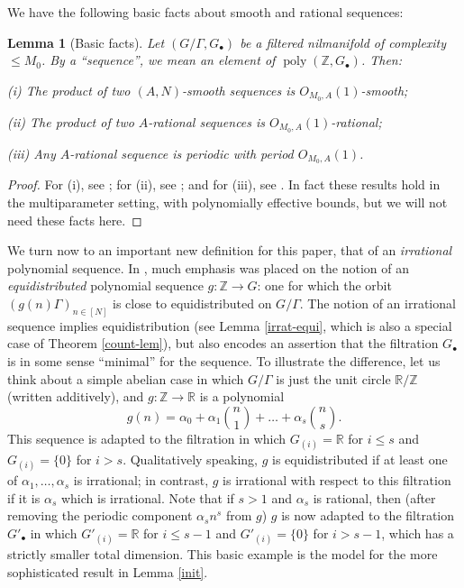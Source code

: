 \documentclass[11pt,reqno]{amsart}
\numberwithin{equation}{section}
\theoremstyle{plain}
\newtheorem{lemma}[subsection]{Lemma}
\theoremstyle{definition}
\renewcommand{\leq}{\leqslant}
\newcommand\Z{\mathbb{Z}}
\newcommand\R{\mathbb{R}}
\newcommand\1{{\bf 1}}
\newcommand\2{{\bf 2}}
\newcommand\poly{\operatorname{poly}}
\begin{document}
We have the following basic facts about smooth and rational sequences:

\begin{lemma}[Basic facts]\label{prod-smooth}  Let $(G/\Gamma,G_\bullet)$ be a filtered nilmanifold of complexity $\leq M_0$. By a ``sequence'', we mean an element of $\poly(\Z,G_{\bullet})$. Then:

\textup{(i)} The product of two $(A,N)$-smooth sequences is $O_{M_0,A}(1)$-smooth;

\textup{(ii)} The product of two $A$-rational sequences is $O_{M_0,A}(1)$-rational;
 
\textup{(iii)} Any $A$-rational sequence is periodic with period $O_{M_0,A}(1)$. 
\end{lemma}

\begin{proof} For (i), see \cite[Lemma 10.1]{green-tao-nilratner}; for (ii), see \cite[Lemma A.11 (v)]{green-tao-nilratner}; and for (iii), see \cite[Lemma A.12 (ii)]{green-tao-nilratner}.  In fact these results hold in the multiparameter setting, with polynomially effective bounds, but we will not need these facts here.
\end{proof}

We turn now to an important new definition for this paper, that of an \emph{irrational} polynomial sequence. In \cite{green-tao-nilratner}, much emphasis was placed on the notion of an \emph{equidistributed} polynomial sequence $g : \Z \rightarrow G$: one for which the orbit $(g(n)\Gamma)_{n \in [N]}$ is close to equidistributed on $G/\Gamma$. The notion of an irrational sequence implies equidistribution (see Lemma \ref{irrat-equi}, which is also a special case of Theorem \ref{count-lem}), but also encodes an assertion that the filtration $G_\bullet$ is in some sense ``minimal'' for the sequence. To illustrate the difference, let us think about a simple abelian case in which $G/\Gamma$ is just the unit circle $\R/\Z$ (written additively), and $g: \Z \to \R$ is a polynomial 
\begin{equation}\label{abelian-eq} g(n) = \alpha_0 + \alpha_1 \binom{n}{1} + \ldots + \alpha_s \binom{n}{s}.
\end{equation}
This sequence is adapted to the filtration in which $G_{(i)}=\R$ for $i \leq s$ and $G_{(i)}=\{0\}$ for $i>s$.
Qualitatively speaking, $g$ is equidistributed if at least one of $\alpha_1,\dots,\alpha_s$ is irrational; in contrast, $g$ is irrational with respect to this filtration if it is $\alpha_s$ which is irrational.  Note that if $s > 1$ and $\alpha_s$ is rational, then (after removing the periodic component $\alpha_s n^s$ from $g$) $g$ is now adapted to the filtration $G'_\bullet$ in which $G'_{(i)}=\R$ for $i \leq s-1$ and $G'_{(i)}=\{0\}$ for $i > s-1$, which has a strictly smaller total dimension.  This basic example is the model for the more sophisticated result in Lemma \ref{init}.
\end{document}
